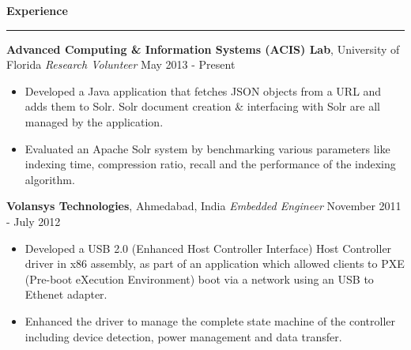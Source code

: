 \documentclass[10pt]{article}
\begin{document}
\textbf{Experience}
\smallskip
\hrule
{\bf Advanced Computing \& Information Systems (ACIS) Lab}, University of Florida
\textit{Research Volunteer} \hfill May 2013 - Present
\begin{itemize}
    \item Developed a Java application that fetches JSON objects from a URL and adds them to Solr. Solr document creation \& interfacing with Solr are all managed by the application. %
    \item Evaluated an Apache Solr system by benchmarking various parameters like indexing time, compression ratio, recall and the performance of the indexing algorithm.
\end{itemize}
{\bf Volansys Technologies}, Ahmedabad, India
\textit{Embedded Engineer} \hfill November 2011 - July 2012
\begin{itemize}
    \item Developed a USB 2.0 (Enhanced Host Controller Interface) Host Controller driver in x86 assembly, as part of an application which allowed clients to PXE (Pre-boot eXecution Environment) boot via a network using an USB to Ethenet adapter. 
    \item Enhanced the driver to manage the complete state machine of the controller including device detection, power management and data transfer. %
\end{itemize}
\end{document}
